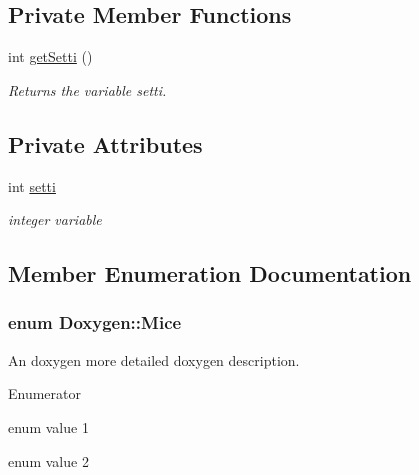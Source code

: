 \subsection*{Private Member Functions}
\begin{DoxyCompactItemize}
\item 
int \hyperlink{classDoxygen_a9ac38fe06a32e600b04fbd66a99a81f3}{get\-Setti} ()
\begin{DoxyCompactList}\small\item\em Returns the variable setti. \end{DoxyCompactList}\end{DoxyCompactItemize}
\subsection*{Private Attributes}
\begin{DoxyCompactItemize}
\item 
\hypertarget{classDoxygen_afa8d33dba539aae9b47b5d644bf62487}{int \hyperlink{classDoxygen_afa8d33dba539aae9b47b5d644bf62487}{setti}}\label{classDoxygen_afa8d33dba539aae9b47b5d644bf62487}

\begin{DoxyCompactList}\small\item\em integer variable \end{DoxyCompactList}\end{DoxyCompactItemize}


\subsection{Member Enumeration Documentation}
\hypertarget{classDoxygen_aa357d9d47e3f1d78d20029894f927379}{
\subsubsection[{Mice}]{\setlength{\rightskip}{0pt plus 5cm}enum {\bf Doxygen\-::\-Mice}}}\label{classDoxygen_aa357d9d47e3f1d78d20029894f927379}


An doxygen more detailed doxygen description. 

\begin{Desc}
\item[Enumerator]\par
\begin{description}
\item[{\em 
\hypertarget{classDoxygen_aa357d9d47e3f1d78d20029894f927379a9d6156a0661afa9b73da2cdd97ca5e71}{mouse}\label{classDoxygen_aa357d9d47e3f1d78d20029894f927379a9d6156a0661afa9b73da2cdd97ca5e71}
}]enum value 1 \item[{\em 
\hypertarget{classDoxygen_aa357d9d47e3f1d78d20029894f927379a6c89fd478d71f650e90e79313744a22a}{mouse2}\label{classDoxygen_aa357d9d47e3f1d78d20029894f927379a6c89fd478d71f650e90e79313744a22a}
}]enum value 2 \end{description}
\end{Desc}

